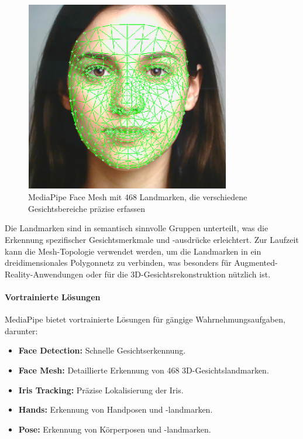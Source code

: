 \begin{figure}[htbp]
    \centering
    \includegraphics[width=0.8\textwidth]{data/FaceMesh_Mediapipe.png}
    \caption{MediaPipe Face Mesh mit 468 Landmarken, die verschiedene Gesichtsbereiche präzise erfassen}
    \label{fig:mediapipe_face_mesh}
\end{figure}

Die Landmarken sind in semantisch sinnvolle Gruppen unterteilt, was die Erkennung spezifischer Gesichtsmerkmale und -ausdrücke erleichtert. Zur Laufzeit kann die Mesh-Topologie verwendet werden, um die Landmarken in ein dreidimensionales Polygonnetz zu verbinden, was besonders für Augmented-Reality-Anwendungen oder für die 3D-Gesichtsrekonstruktion nützlich ist.

\paragraph{Vortrainierte Lösungen}
MediaPipe bietet vortrainierte Lösungen für gängige Wahrnehmungsaufgaben, darunter:

\begin{itemize}
    \item \textbf{Face Detection:} Schnelle Gesichtserkennung.
    \item \textbf{Face Mesh:} Detaillierte Erkennung von 468 3D-Gesichtslandmarken.
    \item \textbf{Iris Tracking:} Präzise Lokalisierung der Iris.
    \item \textbf{Hands:} Erkennung von Handposen und -landmarken.
    \item \textbf{Pose:} Erkennung von Körperposen und -landmarken.
\end{itemize}

